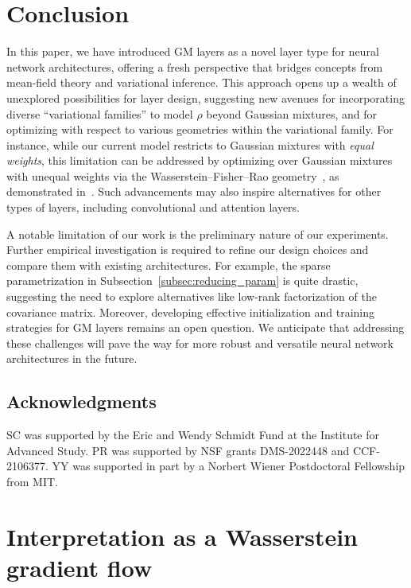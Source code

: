 \documentclass{custom}
\begin{document}
\section{Conclusion}


In this paper, we have introduced GM layers as a novel layer type for neural network architectures, offering a fresh perspective that bridges concepts from mean-field theory and variational inference. This  approach opens up a wealth of unexplored possibilities for layer design, suggesting new avenues for incorporating diverse ``variational families'' to model $\rho$ beyond Gaussian mixtures, and for optimizing with respect to various geometries within the variational family.
For instance, while our current model restricts to Gaussian mixtures with \emph{equal weights}, this limitation can be addressed by optimizing over Gaussian mixtures with unequal weights via the Wasserstein--Fisher--Rao geometry~\citep{LieMieSav16HK, Chi+18FR, LieMieSav18HK,LuLuNol19,yan2023learning}, as demonstrated in~\citet[Appendix H]{Lam+22GVI}. Such advancements may also inspire alternatives for other types of layers, including convolutional and attention layers.

A notable limitation of our work is the preliminary nature of our experiments. Further empirical investigation is required to refine our design choices and compare them with existing architectures. For example, the sparse parametrization in Subsection~\ref{subsec:reducing_param} is quite drastic, suggesting the need to explore alternatives like low-rank factorization of the covariance matrix. Moreover, developing effective initialization and training strategies for GM layers remains an open question. We anticipate that addressing these challenges will pave the way for more robust and versatile neural network architectures in the future.


\subsection*{Acknowledgments}


SC was supported by the Eric and Wendy Schmidt Fund at the Institute for
Advanced Study.
PR was supported by NSF grants DMS-2022448 and CCF-2106377\@.
YY was supported in part by a Norbert Wiener Postdoctoral Fellowship from MIT.


\newpage





\newpage
\appendix


\section{Interpretation as a Wasserstein gradient flow}\label{app:interpretation}
\end{document}
